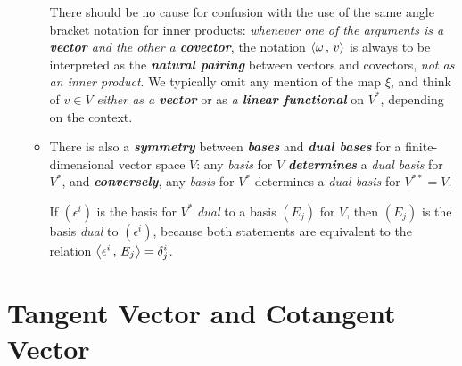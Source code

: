 \documentclass[11pt]{article}
\begin{document}
\begin{itemize}
\begin{remark}
\begin{itemize}
There should be no cause for confusion with the use of the same angle bracket notation for inner products: \emph{whenever one of the arguments is a \textbf{vector} and the other a \textbf{covector}}, the notation $\left\langle \omega\,,\, v \right\rangle$ is always to be interpreted as the \emph{\textbf{natural pairing}} between vectors and covectors, \emph{not as an inner product}. We typically omit any mention of the map $\xi$, and think of $v \in V$ \emph{either as a \textbf{vector}} or as \emph{a \textbf{linear functional}} on $V^{*}$, depending on the context.

\item There is also a \textbf{\emph{symmetry}} between \emph{\textbf{bases}} and \emph{\textbf{dual bases}} for a finite-dimensional vector space $V$: any \emph{basis} for $V$ \emph{\textbf{determines}} a \emph{dual basis} for $V^{*}$, and \emph{\textbf{conversely}}, any \emph{basis} for $V^{*}$ determines a \emph{dual basis} for $V^{**} = V$. 

If $(\epsilon^i)$ is the basis for $V^{*}$ \emph{dual} to a basis $(E_j)$ for $V$, then $(E_j)$ is the basis \emph{dual} to $(\epsilon^i)$, because both statements are equivalent to the relation $\left\langle \epsilon^i\,,\, E_j \right\rangle = \delta_j^i$.
\end{itemize}
\end{remark}
\end{itemize}

\newpage
\section{Tangent Vector and Cotangent Vector}
\end{document}
